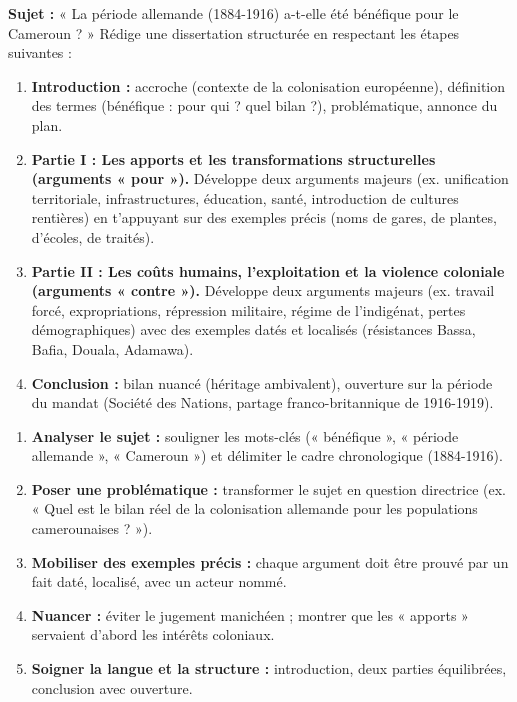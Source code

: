 \documentclass[11pt]{article}
\begin{document}
\begin{exercice}
\textbf{Sujet :} « La période allemande (1884-1916) a-t-elle été bénéfique pour le Cameroun ? »
Rédige une dissertation structurée en respectant les étapes suivantes :
\begin{enumerate}
    \item \textbf{Introduction :} accroche (contexte de la colonisation européenne), définition des termes (bénéfique : pour qui ? quel bilan ?), problématique, annonce du plan.
    \item \textbf{Partie I : Les apports et les transformations structurelles (arguments « pour »).}
    Développe deux arguments majeurs (ex. unification territoriale, infrastructures, éducation, santé, introduction de cultures rentières) en t'appuyant sur des exemples précis (noms de gares, de plantes, d'écoles, de traités).
    \item \textbf{Partie II : Les coûts humains, l'exploitation et la violence coloniale (arguments « contre »).}
    Développe deux arguments majeurs (ex. travail forcé, expropriations, répression militaire, régime de l'indigénat, pertes démographiques) avec des exemples datés et localisés (résistances Bassa, Bafia, Douala, Adamawa).
    \item \textbf{Conclusion :} bilan nuancé (héritage ambivalent), ouverture sur la période du mandat (Société des Nations, partage franco-britannique de 1916-1919).
\end{enumerate}
\end{exercice}

\begin{methode}
\begin{enumerate}
    \item \textbf{Analyser le sujet :} souligner les mots-clés (« bénéfique », « période allemande », « Cameroun ») et délimiter le cadre chronologique (1884-1916).
    \item \textbf{Poser une problématique :} transformer le sujet en question directrice (ex. « Quel est le bilan réel de la colonisation allemande pour les populations camerounaises ? »).
    \item \textbf{Mobiliser des exemples précis :} chaque argument doit être prouvé par un fait daté, localisé, avec un acteur nommé.
    \item \textbf{Nuancer :} éviter le jugement manichéen ; montrer que les « apports » servaient d'abord les intérêts coloniaux.
    \item \textbf{Soigner la langue et la structure :} introduction, deux parties équilibrées, conclusion avec ouverture.
\end{enumerate}
\end{methode}
\end{document}
